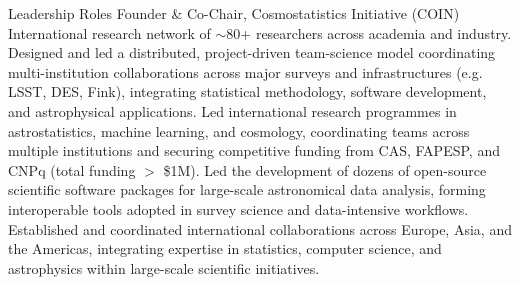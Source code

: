 \begin{rubric}{Leadership Roles}
%
\entry*[2014 -- $~\ldots$]%
Founder \& Co-Chair, Cosmostatistics Initiative (COIN)
International research network of $\sim$80+ researchers across academia and industry. Designed and led a distributed, project-driven team-science model coordinating multi-institution collaborations across major surveys and infrastructures (e.g. LSST, DES, Fink), integrating statistical methodology, software development, and astrophysical applications.
%
\entry*[2017 -- $~\ldots$]%
Led international research programmes in astrostatistics, machine learning, and cosmology, coordinating teams across multiple institutions and securing competitive funding from CAS, FAPESP, and CNPq (total funding $>$ \$1M).
%
\entry*[2015 -- $~\ldots$]%
Led the development of dozens of open-source scientific software packages for large-scale astronomical data analysis, forming interoperable tools adopted in survey science and data-intensive workflows.
%
\entry*[2014 -- $~\ldots$]%
Established and coordinated international collaborations across Europe, Asia, and the Americas, integrating expertise in statistics, computer science, and astrophysics within large-scale scientific initiatives.
\end{rubric}